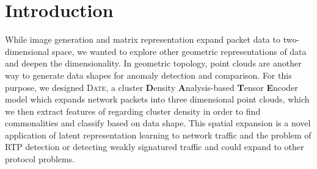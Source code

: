 \section{Introduction}

While image generation and matrix representation expand packet data to two-dimensional space, we wanted to explore other geometric representations of data and deepen the dimensionality. In geometric topology, point clouds are another way to generate data shapes for anomaly detection and comparison. For this purpose, we designed \textsc{Date}, a cluster \textbf{D}ensity \textbf{A}nalysis-based \textbf{T}ensor \textbf{E}ncoder model which expands network packets into three dimensional point clouds, which we then extract features of regarding cluster density in order to find commonalities and classify based on data shape. This spatial expansion is a novel application of latent representation learning to network traffic and the problem of RTP detection or detecting weakly signatured traffic and could expand to other protocol problems.
